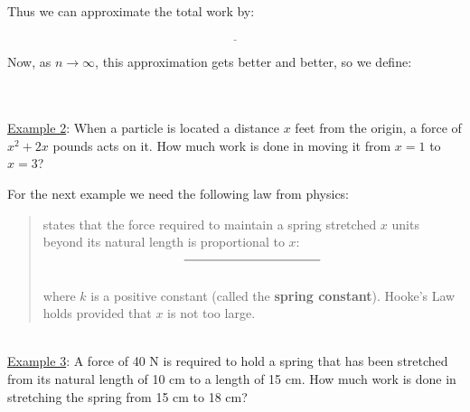 \documentclass[paper=a4, fontsize=11pt]{scrartcl} %
\numberwithin{equation}{section} %
\numberwithin{figure}{section} %
\numberwithin{table}{section} %
\begin{document}
Thus we can approximate the total work by:\\
\indent\\

\[\underline{\hspace{2in}}\]

Now, as $n\to \infty$, this approximation gets better and better, so we define:\\
\indent

\indent\\
\indent\\

\underline{Example 2}: When a particle is located a distance $x$ feet from the origin, a force of $x^2 + 2x$ pounds acts on it. How much work is done in moving it from $x=1$ to $x=3$?\\
\indent

\vspace{1.25in}

For the next example we need the following law from physics:\\


\begin{quote}
\underline{\hspace{1.25in}} \underline{\hspace{0.6in}} states that the force required to maintain a spring stretched $x$ units beyond its natural length is proportional to $x$:\\

\[\underline{\hspace{1.5in}}\]
\indent\\

where $k$ is a positive constant (called the \textbf{spring constant}). Hooke's Law holds provided that $x$ is not too large.\\
\end{quote}
\indent\\

\underline{Example 3}: A force of 40 N is required to hold a spring that has been stretched from its natural length of 10 cm to a length of 15 cm. How much work is done in stretching the spring from 15 cm to 18 cm?\\
\indent
\end{document}
